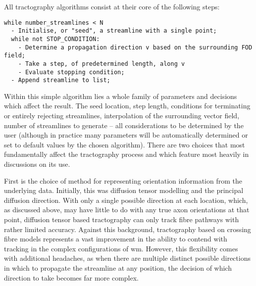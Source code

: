 All  tractography algorithms consist at their core of the following steps:

\begin{verbatim}
while number_streamlines < N
  - Initialise, or "seed", a streamline with a single point;
  while not STOP_CONDITION:
    - Determine a propagation direction v based on the surrounding FOD field;
    - Take a step, of predetermined length, along v
    - Evaluate stopping condition;
  - Append streamline to list;
\end{verbatim}

Within this simple algorithm lies a whole family of parameters and decisions which affect the result.
The seed location, step length, conditions for terminating or entirely rejecting streamlines, interpolation of the surrounding vector field, number of streamlines to generate -- all considerations to be determined by the user (although in practice many parameters will be automatically determined or set to default values by the chosen algorithm).
There are two choices that most fundamentally affect the tractography process and which feature most heavily in discussions on its use.

First is the choice of method for representing orientation information from the underlying data.
Initially, this was diffusion tensor modelling and the principal diffusion direction.
With only a single possible direction at each location, which, as discussed above, may have little to do with any true axon orientations at that point, diffusion tensor based tractography can only track fibre pathways with rather limited accuracy.
Against this background, tractography based on crossing fibre models represents a vast improvement in the ability to contend with tracking in the complex configurations of \gls{wm}.
However, this flexibility comes with additional headaches, as when there are multiple distinct possible directions in which to propagate the streamline at any position, the decision of which direction to take becomes far more complex.

